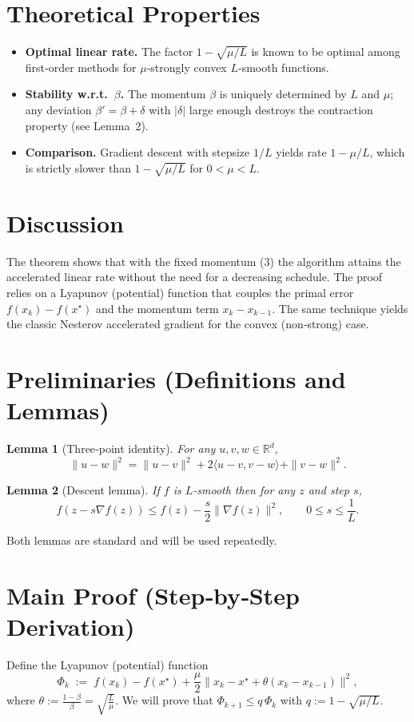 \documentclass{article}
\newtheorem{lemma}{Lemma}
\newcommand{\grad}{\nabla}
\begin{document}
\section*{Theoretical Properties}
\begin{itemize}
\item \textbf{Optimal linear rate.} The factor $1-\sqrt{\mu/L}$ is known to be optimal among first‑order methods for $\mu$‑strongly convex $L$‑smooth functions.
\item \textbf{Stability w.r.t.\ $\beta$.} The momentum $\beta$ is uniquely determined by $L$ and $\mu$; any deviation $\beta'=\beta+\delta$ with $|\delta|$ large enough destroys the contraction property (see Lemma~2).
\item \textbf{Comparison.} Gradient descent with stepsize $1/L$ yields rate $1-\mu/L$, which is strictly slower than $1-\sqrt{\mu/L}$ for $0<\mu<L$.
\end{itemize}

\section*{Discussion}
The theorem shows that with the fixed momentum (3) the algorithm attains the accelerated linear rate without the need for a decreasing schedule. The proof relies on a Lyapunov (potential) function that couples the primal error $f(x_k)-f(x^\star)$ and the momentum term $x_k-x_{k-1}$. The same technique yields the classic Nesterov accelerated gradient for the convex (non‑strong) case.

\section*{Preliminaries (Definitions and Lemmas)}
\begin{lemma}[Three‑point identity]\label{lem:three}
For any $u,v,w\in\mathbb{R}^d$,
\[
\|u-w\|^2 = \|u-v\|^2 + 2\langle u-v, v-w\rangle + \|v-w\|^2.
\tag{6}
\]
\end{lemma}
\begin{lemma}[Descent lemma]\label{lem:descent}
If $f$ is $L$‑smooth then for any $z$ and step $s$,
\[
f(z-s\grad f(z)) \le f(z)-\frac{s}{2}\|\grad f(z)\|^2,\qquad 0\le s\le \frac{1}{L}.
\tag{7}
\]
\end{lemma}
Both lemmas are standard and will be used repeatedly.

\section*{Main Proof (Step‑by‑Step Derivation)}
Define the Lyapunov (potential) function
\[
\Phi_k \;:=\; f(x_k)-f(x^\star)+\frac{\mu}{2}\|x_k-x^\star+\theta (x_k-x_{k-1})\|^2,
\tag{8}
\]
where $\theta:=\frac{1-\beta}{\beta}=\sqrt{\frac{L}{\mu}}$.  
We will prove that $\Phi_{k+1}\le q\,\Phi_k$ with $q:=1-\sqrt{\mu/L}$.
\end{document}
